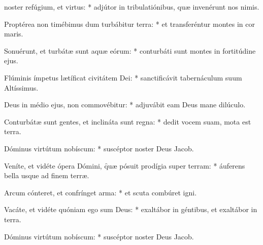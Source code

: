 \begin{psalmus}

     noster refúgium, et virtus: * adjútor in tribulatiónibus, quæ invenérunt nos nimis.

    Proptérea non timébimus dum turbábitur terra: * et transferéntur montes in cor maris.

    Sonuérunt, et turbátæ sunt aquæ eórum: * conturbáti sunt montes in fortitúdine ejus.

    Flúminis ímpetus lætíficat civitátem Dei: * sanctificávit tabernáculum suum Altíssimus.

    Deus in médio ejus, non commovébitur: * adjuvábit eam Deus mane dilúculo.

    Conturbátæ sunt gentes, et inclináta sunt regna: * dedit vocem suam, mota est terra.

    Dóminus virtútum nobíscum: * suscéptor noster Deus Jacob.

    Veníte, et vidéte ópera Dómini, \f quæ pósuit prodígia super terram: * áuferens bella usque ad finem terræ.

    Arcum cónteret, et confrínget arma: * et scuta combúret igni.

    Vacáte, et vidéte quóniam ego sum Deus: * exaltábor in géntibus, et exaltábor in terra.

    Dóminus virtútum nobíscum: * suscéptor noster Deus Jacob.

\end{psalmus}
